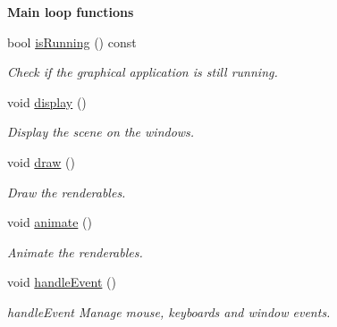 \begin{Indent}{\bf Main loop functions}\par
\begin{DoxyCompactItemize}
\item 
bool \hyperlink{classViewer_a96ee8c50a356c64393478da709ebac78}{is\+Running} () const 
\begin{DoxyCompactList}\small\item\em Check if the graphical application is still running. \end{DoxyCompactList}\item 
void \hyperlink{classViewer_a277a934adb86150b09d044b7cee822f8}{display} ()
\begin{DoxyCompactList}\small\item\em Display the scene on the windows. \end{DoxyCompactList}\item 
void \hyperlink{classViewer_a9ce9d06343c4e089ac76b19f78fe29e4}{draw} ()
\begin{DoxyCompactList}\small\item\em Draw the renderables. \end{DoxyCompactList}\item 
void \hyperlink{classViewer_a7114e33ca0c224c2206b53dee77fe7fe}{animate} ()
\begin{DoxyCompactList}\small\item\em Animate the renderables. \end{DoxyCompactList}\item 
void \hyperlink{classViewer_af29c9abea6accf5d93fffb37aeb1a18d}{handle\+Event} ()
\begin{DoxyCompactList}\small\item\em handle\+Event Manage mouse, keyboards and window events. \end{DoxyCompactList}\end{DoxyCompactItemize}
\end{Indent}
